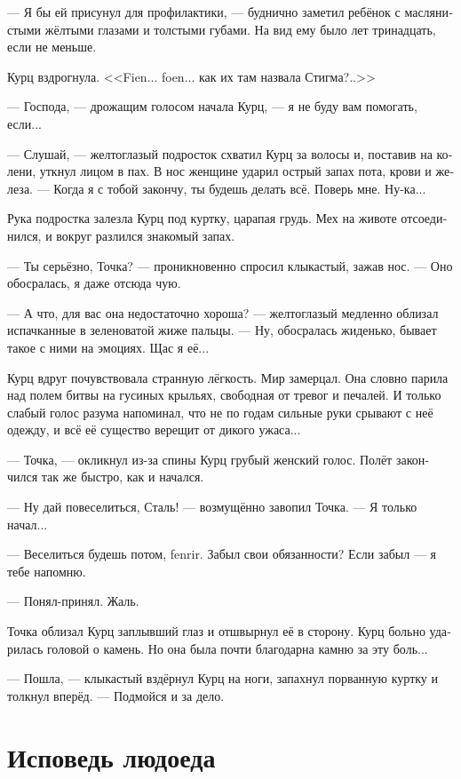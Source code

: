 \documentclass[a4paper,12pt,fleqn]{book}\usepackage{cooltooltips}\usepackage{polyglossia}\setdefaultlanguage[babelshorthands=true]{russian}\setotherlanguage{english}\defaultfontfeatures{Ligatures=TeX,Mapping=tex-text} \usepackage{xcolor}\definecolor{lightgray}{HTML}{bbbbbb}\color{lightgray}\newcommand{\ml}[3]{\textenglish{\textcolor{black}{#3}}}
\begin{document}
--- Я бы ей присунул для профилактики, --- буднично заметил ребёнок с маслянистыми жёлтыми глазами и толстыми губами.
На вид ему было лет тринадцать, если не меньше.

Курц вздрогнула.
<<Fien... foen... как их там назвала Стигма?..>>

--- Господа, --- дрожащим голосом начала Курц, --- я не буду вам помогать, если...

--- Слушай, --- желтоглазый подросток схватил Курц за волосы и, поставив на колени, уткнул лицом в пах.
В нос женщине ударил острый запах пота, крови и железа.
--- Когда я с тобой закончу, ты будешь делать всё.
Поверь мне.
Ну-ка...

Рука подростка залезла Курц под куртку, царапая грудь.
Мех на животе отсоединился, и вокруг разлился знакомый запах.

--- Ты серьёзно, Точка? --- проникновенно спросил клыкастый, зажав нос.
--- Оно обосралась, я даже отсюда чую.

--- А что, для вас она недостаточно хороша? --- желтоглазый медленно облизал испачканные в зеленоватой жиже пальцы.
--- Ну, обосралась жиденько, бывает такое с ними на эмоциях.
Щас я её...

Курц вдруг почувствовала странную лёгкость.
Мир замерцал.
Она словно парила над полем битвы на гусиных крыльях, свободная от тревог и печалей.
И только слабый голос разума напоминал, что не по годам сильные руки срывают с неё одежду, и всё её существо верещит от дикого ужаса...

--- Точка, --- окликнул из-за спины Курц грубый женский голос.
Полёт закончился так же быстро, как и начался.

--- Ну дай повеселиться, Сталь! --- возмущённо завопил Точка.
--- Я только начал...

--- Веселиться будешь потом, fenrir.
Забыл свои обязанности?
Если забыл --- я тебе напомню.

--- Понял-принял.
Жаль.

Точка облизал Курц заплывший глаз и отшвырнул её в сторону.
Курц больно ударилась головой о камень.
Но она была почти благодарна камню за эту боль...

--- Пошла, --- клыкастый вздёрнул Курц на ноги, запахнул порванную куртку и толкнул вперёд.
--- Подмойся и за дело.

\section{Исповедь людоеда}
\end{document}
